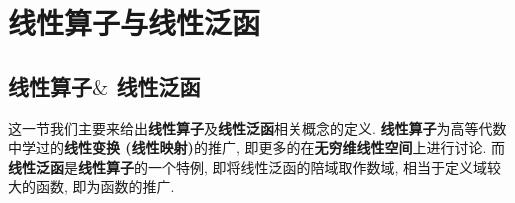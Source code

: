 \ifx\allfiles\undefined


	\else
	\fi
\chapter{线性算子与线性泛函}
	
\section{线性算子$\&$ 线性泛函}
	这一节我们主要来给出\textbf{线性算子}及\textbf{线性泛函}相关概念的定义. \textbf{线性算子}为高等代数中学过的\textbf{线性变换 (线性映射)}的推广, 即更多的在\textbf{无穷维线性空间}上进行讨论. 而\textbf{线性泛函}是\textbf{线性算子}的一个特例, 即将线性泛函的陪域取作数域, 相当于定义域较大的函数, 即为函数的推广. 
	
	\vspace{1em}
	
